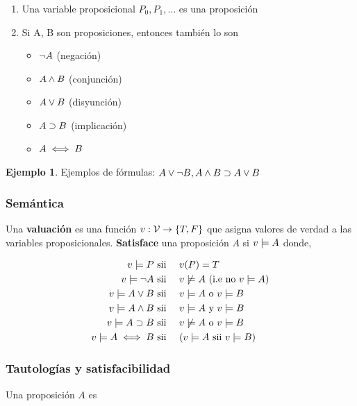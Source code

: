\documentclass{report}
\theoremstyle{definition} %
\newtheorem*{example*}{Ejemplo}
\newcommand{\tfunc}[2]{#1 \to #2}
\begin{document}
\begin{enumerate}
    \item Una variable proposicional $P_0, P_1, \dots$ es una proposición
    \item Si A, B son proposiciones, entonces también lo son
    \begin{itemize}
        \item $\neg A$ (negación)
        \item $A \wedge B$ (conjunción)
        \item $A \vee B$ (disyunción)
        \item $A \supset B$ (implicación)
        \item $A \iff B$
    \end{itemize}

\end{enumerate}
\begin{example*}
    Ejemplos de fórmulas: 
    $A \vee \neg B, A \wedge B \supset A \vee B$
\end{example*}

\subsubsection{Semántica}

Una \textbf{valuación} es una función $v: \tfunc{\propVars}{\{ T, F \}}$ que
asigna valores de verdad a las variables proposicionales. \textbf{Satisface} una
proposición $A$ si $v \models A$ donde,

\begin{alignat*}{2}
    v \models P & \text{ sii } && v(P) = T\\
    v \models \neg A & \text{ sii }&& v \not\models A \text{ (i.e no $v \models A$)}\\
    v \models A \vee B & \text{ sii }&& v \models A \text{ o } v \models B\\
    v \models A \wedge B & \text{ sii }&& v \models A \text{ y } v \models B\\
    v \models A \supset B &\text{ sii }&& v \not\models A \text{ o } v \models B\\
    v \models A \iff B & \text{ sii }&& (v \models A \text{ sii } v \models B)
\end{alignat*}

\subsubsection{Tautologías y satisfacibilidad}

Una proposición $A$ es
\end{document}
